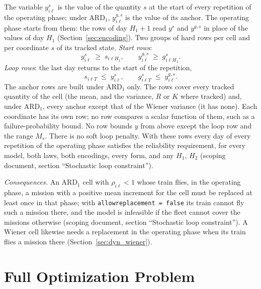 \documentclass[11pt,a4paper]{article}
\theoremstyle{plain}
\theoremstyle{definition}
\newcommand{\ARDone}{\mathrm{ARD}_{1}}
\renewcommand{\_}{\textunderscore\allowbreak{}}
\begin{document}
The variable $y^s_{i\ell}$ is the value of the quantity $s$ at the start of every
repetition of the operating phase; under $\ARDone$, $y^{g,s}_{i\ell}$ is the value of
its anchor. The operating phase starts from them: the rows of day $H_1 + 1$ read
$y^s$ and $y^{g,s}$ in place of the values of day $H_1$ (Section~\ref{sec:encoding}).
Two groups of hard rows per cell and per coordinate $s$ of its tracked state.
\emph{Start rows}:
\begin{equation}
  y^s_{i\ell} \;\geq\; s_{i\ell H_1}, \qquad
  y^{g,s}_{i\ell} \;\geq\; g^s_{i\ell H_1}.
  \label{eq:a_start}
\end{equation}
\emph{Loop rows}: the last day returns to the start of the repetition,
\begin{equation}
  s_{i\ell T} \;\leq\; y^s_{i\ell}, \qquad
  g^s_{i\ell T} \;\leq\; y^{g,s}_{i\ell}.
  \label{eq:a_loop}
\end{equation}
The anchor rows are built under $\ARDone$ only. The rows cover every tracked quantity of
the cell (the mean, and the variance, $R$ or $K$ where tracked) and, under $\ARDone$,
every anchor except that of the Wiener variance (it has none). Each coordinate has its own
row; no row compares a scalar function of them, such as a failure-probability bound.
No row bounds $y$ from above except the loop row and the range $M_s$.
There is no soft loop penalty. With these rows every day of every repetition of the
operating phase satisfies the reliability requirement, for every model, both laws,
both encodings, every form, and any $H_1$, $H_2$ (scoping document, section
``Stochastic loop constraint'').

\emph{Consequences.} An $\ARDone$ cell with $\rho_{i\ell} < 1$ whose train flies, in the
operating phase, a mission with a positive mean increment for the cell must be
replaced at least once in that phase; with \texttt{allow\_replacement = false} its
train cannot fly such a mission there, and the model is infeasible if the fleet
cannot cover the missions otherwise (scoping document, section ``Stochastic loop
constraint''). A Wiener cell likewise needs a replacement in the operating phase
when its train flies a mission there (Section~\ref{sec:dyn_wiener}).

\section{Full Optimization Problem}
\label{sec:full_problem}
\end{document}
